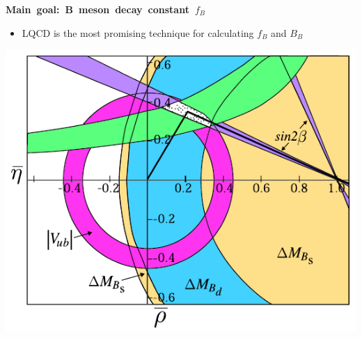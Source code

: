 \documentclass[landscape]{article}
\newenvironment{slide}[1][ ]{\mbox{\bf #1 } \vfill}{\vfill \mbox{ } \pagebreak}
\begin{document}
\begin{slide}[Main goal: B meson decay constant \boldmath $f_B$]
\begin{minipage}{14 cm}
\begin{itemize}
\item LQCD is the most promising technique for calculating $f_B$ and $B_B$
\end{itemize}
\end{minipage} \hfill \begin{minipage}{10 cm} \includegraphics[width=\linewidth]{ckm04} \end{minipage}

\end{slide}




\end{document}
